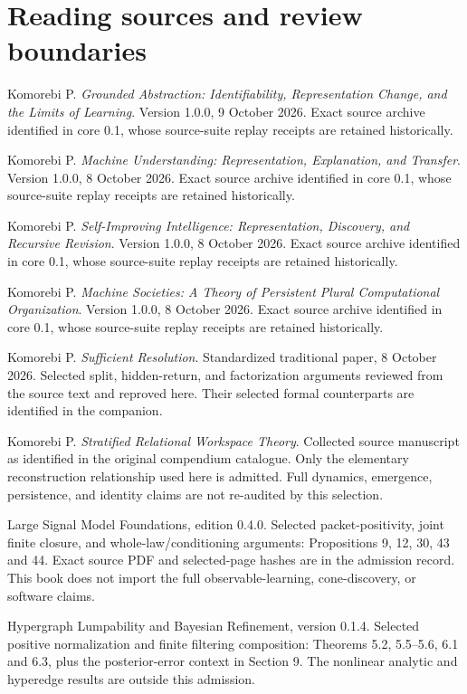 \documentclass[11pt,oneside,openany]{book}
\theoremstyle{definition}\newtheorem{definition}[theorem]{Definition}
\begin{document}
\chapter{Reading sources and review boundaries}
\begin{description}[style=nextline]
\item[GA] Komorebi P. \emph{Grounded Abstraction: Identifiability, Representation Change, and the Limits of Learning}. Version 1.0.0, 9 October 2026. Exact source archive identified in core 0.1, whose source-suite replay receipts are retained historically.
\item[MU] Komorebi P. \emph{Machine Understanding: Representation, Explanation, and Transfer}. Version 1.0.0, 8 October 2026. Exact source archive identified in core 0.1, whose source-suite replay receipts are retained historically.
\item[SII] Komorebi P. \emph{Self-Improving Intelligence: Representation, Discovery, and Recursive Revision}. Version 1.0.0, 8 October 2026. Exact source archive identified in core 0.1, whose source-suite replay receipts are retained historically.
\item[MS] Komorebi P. \emph{Machine Societies: A Theory of Persistent Plural Computational Organization}. Version 1.0.0, 8 October 2026. Exact source archive identified in core 0.1, whose source-suite replay receipts are retained historically.
\item[SR] Komorebi P. \emph{Sufficient Resolution}. Standardized traditional paper, 8 October 2026. Selected split, hidden-return, and factorization arguments reviewed from the source text and reproved here. Their selected formal counterparts are identified in the companion.
\item[SRWT] Komorebi P. \emph{Stratified Relational Workspace Theory}. Collected source manuscript as identified in the original compendium catalogue. Only the elementary reconstruction relationship used here is admitted. Full dynamics, emergence, persistence, and identity claims are not re-audited by this selection.
\item[LSM] Large Signal Model Foundations, edition 0.4.0.
Selected packet-positivity, joint finite closure, and whole-law/conditioning arguments: Propositions 9, 12, 30, 43 and 44. Exact source PDF and selected-page hashes are in the admission record. This book does not import the full observable-learning, cone-discovery, or software claims.

\item[PRIQ] Hypergraph Lumpability and Bayesian Refinement, version 0.1.4.
Selected positive normalization and finite filtering composition: Theorems 5.2, 5.5--5.6, 6.1 and 6.3, plus the posterior-error context in Section 9. The nonlinear analytic and hyperedge results are outside this admission.


\end{description}
\end{document}
